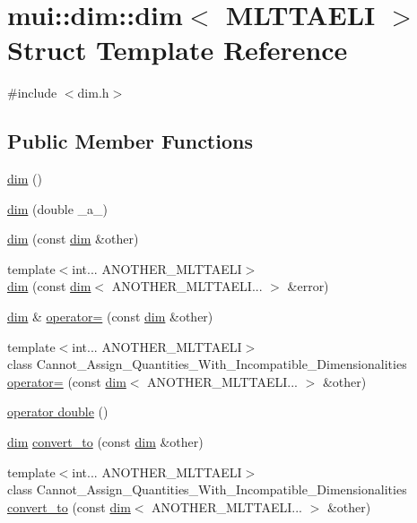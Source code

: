 \hypertarget{structmui_1_1dim_1_1dim}{}\section{mui\+:\+:dim\+:\+:dim$<$ M\+L\+T\+T\+A\+E\+LI $>$ Struct Template Reference}
\label{structmui_1_1dim_1_1dim}


{\ttfamily \#include $<$dim.\+h$>$}

\subsection*{Public Member Functions}
\begin{DoxyCompactItemize}
\item 
\hyperlink{structmui_1_1dim_1_1dim_ad5222f9fcfd07db9c132003b4544ff76}{dim} ()
\item 
\hyperlink{structmui_1_1dim_1_1dim_a8a9104f25986d886cdd98a3e8abdd65d}{dim} (double \+\_\+a\+\_\+)
\item 
\hyperlink{structmui_1_1dim_1_1dim_a740a39809e358db97b0c1a00317e678f}{dim} (const \hyperlink{structmui_1_1dim_1_1dim}{dim} \&other)
\item 
{\footnotesize template$<$int... A\+N\+O\+T\+H\+E\+R\+\_\+\+M\+L\+T\+T\+A\+E\+LI$>$ }\\\hyperlink{structmui_1_1dim_1_1dim_aef3b03be0f2d4385d189eb02675a2a16}{dim} (const \hyperlink{structmui_1_1dim_1_1dim}{dim}$<$ A\+N\+O\+T\+H\+E\+R\+\_\+\+M\+L\+T\+T\+A\+E\+L\+I... $>$ \&error)
\item 
\hyperlink{structmui_1_1dim_1_1dim}{dim} \& \hyperlink{structmui_1_1dim_1_1dim_a59aeac99c9356fd0c44d21ed6bbf9ae7}{operator=} (const \hyperlink{structmui_1_1dim_1_1dim}{dim} \&other)
\item 
{\footnotesize template$<$int... A\+N\+O\+T\+H\+E\+R\+\_\+\+M\+L\+T\+T\+A\+E\+LI$>$ }\\class Cannot\+\_\+\+Assign\+\_\+\+Quantities\+\_\+\+With\+\_\+\+Incompatible\+\_\+\+Dimensionalities \hyperlink{structmui_1_1dim_1_1dim_a05ee5bceb54e51d08bf9f3e99461160e}{operator=} (const \hyperlink{structmui_1_1dim_1_1dim}{dim}$<$ A\+N\+O\+T\+H\+E\+R\+\_\+\+M\+L\+T\+T\+A\+E\+L\+I... $>$ \&other)
\item 
\hyperlink{structmui_1_1dim_1_1dim_a918d850a1a6585ee8a4147b10f5c4998}{operator double} ()
\item 
\hyperlink{structmui_1_1dim_1_1dim}{dim} \hyperlink{structmui_1_1dim_1_1dim_ad3a650609305c544581a749cb338a50b}{convert\+\_\+to} (const \hyperlink{structmui_1_1dim_1_1dim}{dim} \&other)
\item 
{\footnotesize template$<$int... A\+N\+O\+T\+H\+E\+R\+\_\+\+M\+L\+T\+T\+A\+E\+LI$>$ }\\class Cannot\+\_\+\+Assign\+\_\+\+Quantities\+\_\+\+With\+\_\+\+Incompatible\+\_\+\+Dimensionalities \hyperlink{structmui_1_1dim_1_1dim_a3004be3cf40d7fed041b18eb841687ac}{convert\+\_\+to} (const \hyperlink{structmui_1_1dim_1_1dim}{dim}$<$ A\+N\+O\+T\+H\+E\+R\+\_\+\+M\+L\+T\+T\+A\+E\+L\+I... $>$ \&other)
\end{DoxyCompactItemize}
